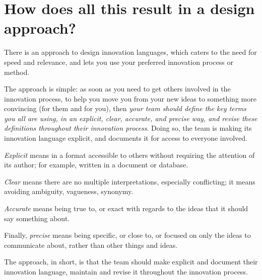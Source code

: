 \section{How does all this result in a design approach?}
\label{c2:s8}
There is an approach to design innovation languages, which caters to the need for speed and relevance, and lets you use your preferred innovation process or method.

The approach is simple: as soon as you need to get others involved in the innovation process, to help you move you from your new ideas to something more convincing (for them and for you), then \textit{your team should define the key terms you all are using, in an explicit, clear, accurate, and precise way, and revise these definitions throughout their innovation process}. Doing so, the team is making its innovation language explicit, and documents it for access to everyone involved.

\textit{Explicit} means in a format accessible to others without requiring the attention of its author; for example, written in a document or database. 

\textit{Clear} means there are no multiple interpretations, especially conflicting; it means avoiding ambiguity, vagueness, synonymy. 

\textit{Accurate} means being true to, or exact with regards to the ideas that it should say something about. 

Finally, \textit{precise} means being specific, or close to, or focused on only the ideas to communicate about, rather than other things and ideas. 

The approach, in short, is that the team should make explicit and document their innovation language, maintain and revise it throughout the innovation process.


\printbibliography